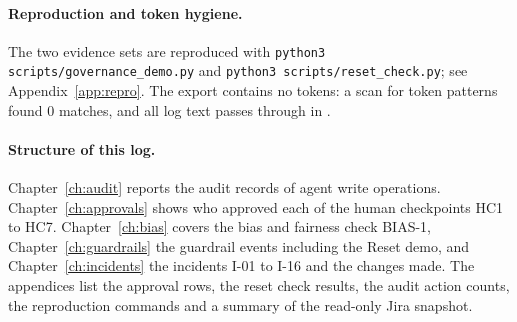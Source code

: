 \paragraph*{Reproduction and token hygiene.} The two evidence sets are reproduced with \texttt{python3 scripts/governance\_demo.py} and \texttt{python3 scripts/reset\_check.py}; see Appendix~\ref{app:repro}. The export contains no tokens: a scan for token patterns found 0 matches, and all log text passes through  in .

\paragraph*{Structure of this log.} Chapter~\ref{ch:audit} reports the audit records of agent write operations. Chapter~\ref{ch:approvals} shows who approved each of the human checkpoints HC1 to HC7. Chapter~\ref{ch:bias} covers the bias and fairness check BIAS-1, Chapter~\ref{ch:guardrails} the guardrail events including the Reset demo, and Chapter~\ref{ch:incidents} the incidents I-01 to I-16 and the changes made. The appendices list the approval rows, the reset check results, the audit action counts, the reproduction commands and a summary of the read-only Jira snapshot.
